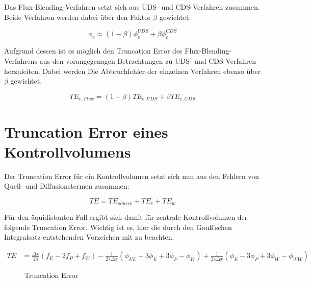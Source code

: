\documentclass[10pt, ngerman,colorback,accentcolor=tud2d]{tudreport}
\begin{document}
Das Flux-Blending-Verfahren setzt sich aus UDS- und CDS-Verfahren zusammen. Beide
Verfahren werden dabei über den Faktor $\beta$ gewichtet.

\begin{equation*}
\phi_e \approx (1-\beta)\phi_e^{UDS} + \beta \phi_e^{CDS} 
\end{equation*}

Aufgrund dessen ist es möglich den Truncation Error des Flux-Blending-Verfahrens aus
den vorangegenagen Betrachtungen zu UDS- und CDS-Verfahren herzuleiten.
Dabei werden Die Abbruchfehler der einzelnen Verfahren ebenso über $\beta$ gewichtet.

\begin{equation}
  TE_{e, Flux} = (1-\beta) TE_{e, UDS} + \beta TE_{e, CDS}
\end{equation}



\section{Truncation Error eines Kontrollvolumens}
\label{sec:Truncation Error eines Kontrollvolumens}

Der Truncation Error für ein Kontrollvolumen setzt sich nun aus den Fehlern von Quell-
und Diffusionstermen zusammen:

\begin{equation*}
  TE = TE_{source} + TE_e + TE_w
\end{equation*}

Für den äquidistanten Fall ergibt sich damit für zentrale Kontrollvolumen der folgende
Truncation Error. Wichtig ist es, hier die durch den Gauß'schen Integralsatz 
entstehenden Vorzeichen mit zu beachten.

\begin{align}
  TE &= \frac{\Delta x}{24} \left({f_E-2f_P+f_W}\right)
   -\frac{1}{24\Delta x}\left({
\phi_{EE}-3\phi_E+3\phi_P-\phi_W}\right)
  +\frac{1}{24 \Delta x}\left({
\phi_E-3\phi_P+3\phi_W-\phi_{WW}}\right)
\end{align}

\begin{figure}[h]
\caption{Truncation Error}
\end{figure}
\end{document}
